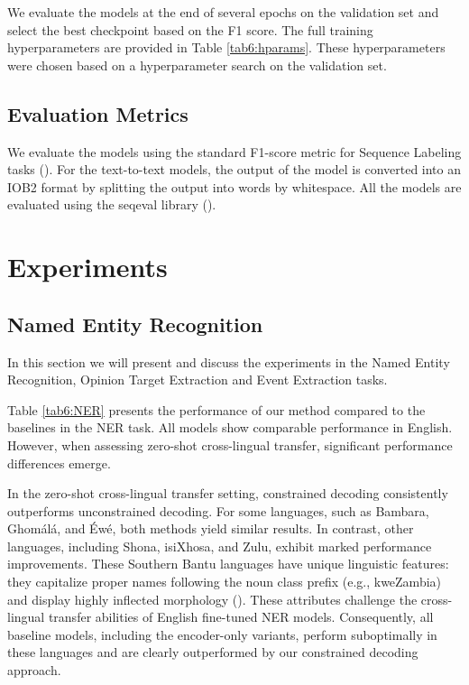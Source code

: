 We evaluate the models at the end of several epochs on the validation set and select the best checkpoint based on the F1 score. The full training hyperparameters are provided in Table \ref{tab6:hparams}. These hyperparameters were chosen based on a hyperparameter search on the validation set. 

\subsection{Evaluation Metrics}

We evaluate the models using the standard F1-score metric for Sequence Labeling tasks (\cite{DBLP:conf/conll/SangM03}). For the text-to-text models, the output of the model is converted into an IOB2 format by splitting the output into words by whitespace. All the models are evaluated using the seqeval library (\cite{seqeval}).

\section{Experiments}
\label{sc6:experiments}

\subsection{Named Entity Recognition}
\label{sc6:ner}

In this section we will present and discuss the experiments in the Named Entity Recognition, Opinion Target Extraction and Event Extraction tasks. 



Table \ref{tab6:NER} presents the performance of our method compared to the baselines in the NER task. All models show comparable performance in English. However, when assessing zero-shot cross-lingual transfer, significant performance differences emerge.

In the zero-shot cross-lingual transfer setting, constrained decoding consistently outperforms unconstrained decoding. For some languages, such as Bambara, Ghomálá, and Éwé, both methods yield similar results. In contrast, other languages, including Shona, isiXhosa, and Zulu, exhibit marked performance improvements. These Southern Bantu languages have unique linguistic features: they capitalize proper names following the noun class prefix (e.g., kweZambia) and display highly inflected morphology (\cite{adelani-etal-2022-masakhaner}). These attributes challenge the cross-lingual transfer abilities of English fine-tuned NER models. Consequently, all baseline models, including the encoder-only variants, perform suboptimally in these languages and are clearly outperformed by our constrained decoding approach.


